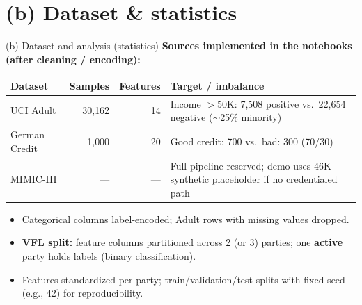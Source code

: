 \documentclass[11pt,aspectratio=169]{beamer}
\begin{document}
\section*{(b) Dataset \& statistics}
\begin{frame}{(b) Dataset and analysis (statistics)}
  \textbf{Sources implemented in the notebooks (after cleaning / encoding):}
  \vspace{0.3em}
  \begin{center}
    \small
    \begin{tabular}{@{}lrrp{5.2cm}@{}}
      \toprule
      \textbf{Dataset} & \textbf{Samples} & \textbf{Features} & \textbf{Target / imbalance} \\
      \midrule
      UCI Adult & 30{,}162 & 14 & Income $>$50K: 7{,}508 positive vs.\ 22{,}654 negative ($\sim$25\% minority) \\
      German Credit & 1{,}000 & 20 & Good credit: 700 vs.\ bad: 300 (70/30) \\
      MIMIC-III & --- & --- & Full pipeline reserved; demo uses 46K synthetic placeholder if no credentialed path \\
      \bottomrule
    \end{tabular}
  \end{center}
  \vspace{0.4em}
  \begin{itemize}
    \item Categorical columns label-encoded; Adult rows with missing values dropped.
    \item \textbf{VFL split:} feature columns partitioned across 2 (or 3) parties; one \textbf{active} party holds labels (binary classification).
    \item Features standardized per party; train/validation/test splits with fixed seed (e.g., 42) for reproducibility.
  \end{itemize}
\end{frame}

\end{document}
